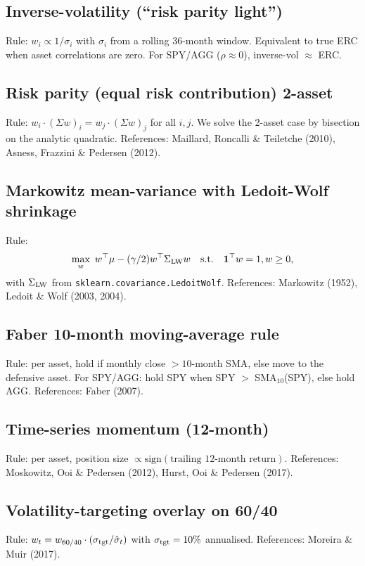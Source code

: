 \documentclass[11pt]{article}
\theoremstyle{plain1}
\theoremstyle{definition1}
\newcommand{\1}{\mathbf{1}}
\begin{document}
\subsection{Inverse-volatility (``risk parity light'')}
Rule: $w_i \propto 1/\sigma_i$ with $\sigma_i$ from a rolling 36-month window. Equivalent to true ERC when asset correlations are zero. For SPY/AGG ($\rho \approx 0$), inverse-vol $\approx$ ERC.

\subsection{Risk parity (equal risk contribution) 2-asset}
Rule: $w_i \cdot (\Sigma w)_i = w_j \cdot (\Sigma w)_j$ for all $i,j$. We solve the 2-asset case by bisection on the analytic quadratic. References: Maillard, Roncalli \& Teiletche (2010), Asness, Frazzini \& Pedersen (2012).

\subsection{Markowitz mean-variance with Ledoit-Wolf shrinkage}
Rule:
\[
\max_w\ w^\top \mu - (\gamma/2) w^\top \Sigma_{\rm LW} w \quad\text{s.t.}\quad \1^\top w = 1, w \geq 0,
\]
with $\Sigma_{\rm LW}$ from \texttt{sklearn.covariance.LedoitWolf}. References: Markowitz (1952), Ledoit \& Wolf (2003, 2004).

\subsection{Faber 10-month moving-average rule}
Rule: per asset, hold if monthly close $> 10$-month SMA, else move to the defensive asset. For SPY/AGG: hold SPY when SPY $>$ SMA$_{10}$(SPY), else hold AGG. References: Faber (2007).

\subsection{Time-series momentum (12-month)}
Rule: per asset, position size $\propto \text{sign}(\text{trailing 12-month return})$. References: Moskowitz, Ooi \& Pedersen (2012), Hurst, Ooi \& Pedersen (2017).

\subsection{Volatility-targeting overlay on 60/40}
Rule: $w_t = w_{\text{60/40}} \cdot (\sigma_{\rm tgt} / \hat\sigma_t)$ with $\sigma_{\rm tgt} = 10\%$ annualised. References: Moreira \& Muir (2017).
\end{document}
